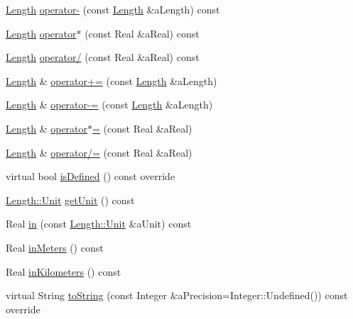 \begin{DoxyCompactItemize}
\item 
\hyperlink{classlibrary_1_1physics_1_1units_1_1_length}{Length} \hyperlink{classlibrary_1_1physics_1_1units_1_1_length_af34113f000f221058dc48df951c0c861}{operator-\/} (const \hyperlink{classlibrary_1_1physics_1_1units_1_1_length}{Length} \&a\+Length) const
\item 
\hyperlink{classlibrary_1_1physics_1_1units_1_1_length}{Length} \hyperlink{classlibrary_1_1physics_1_1units_1_1_length_ab14bc23b1849cb38d2f9ede2bda27ca5}{operator$\ast$} (const Real \&a\+Real) const
\item 
\hyperlink{classlibrary_1_1physics_1_1units_1_1_length}{Length} \hyperlink{classlibrary_1_1physics_1_1units_1_1_length_a00c891576d9dac185b81cca7d705653e}{operator/} (const Real \&a\+Real) const
\item 
\hyperlink{classlibrary_1_1physics_1_1units_1_1_length}{Length} \& \hyperlink{classlibrary_1_1physics_1_1units_1_1_length_ac3a51c8bd2a7c6f9ef39a3444d0bc3dc}{operator+=} (const \hyperlink{classlibrary_1_1physics_1_1units_1_1_length}{Length} \&a\+Length)
\item 
\hyperlink{classlibrary_1_1physics_1_1units_1_1_length}{Length} \& \hyperlink{classlibrary_1_1physics_1_1units_1_1_length_a5b02e27f94eea5c5b2b4c7a8e36ab243}{operator-\/=} (const \hyperlink{classlibrary_1_1physics_1_1units_1_1_length}{Length} \&a\+Length)
\item 
\hyperlink{classlibrary_1_1physics_1_1units_1_1_length}{Length} \& \hyperlink{classlibrary_1_1physics_1_1units_1_1_length_a60c23be1726de0970339298e4053e75d}{operator$\ast$=} (const Real \&a\+Real)
\item 
\hyperlink{classlibrary_1_1physics_1_1units_1_1_length}{Length} \& \hyperlink{classlibrary_1_1physics_1_1units_1_1_length_a42aee215b77a88b3c032b1fc6b8d7117}{operator/=} (const Real \&a\+Real)
\item 
virtual bool \hyperlink{classlibrary_1_1physics_1_1units_1_1_length_a0249a542e7cc613e6a39275b4e37bd05}{is\+Defined} () const override
\item 
\hyperlink{classlibrary_1_1physics_1_1units_1_1_length_a3b8b39cd245cf6b19dc34459baeccb18}{Length\+::\+Unit} \hyperlink{classlibrary_1_1physics_1_1units_1_1_length_ab0a44822f33903e24c3dc8021d185348}{get\+Unit} () const
\item 
Real \hyperlink{classlibrary_1_1physics_1_1units_1_1_length_a8cabc872d3de8fe8c9abf9d09462a7e8}{in} (const \hyperlink{classlibrary_1_1physics_1_1units_1_1_length_a3b8b39cd245cf6b19dc34459baeccb18}{Length\+::\+Unit} \&a\+Unit) const
\item 
Real \hyperlink{classlibrary_1_1physics_1_1units_1_1_length_ae8064733601131d3ccf1e5d53ecaf001}{in\+Meters} () const
\item 
Real \hyperlink{classlibrary_1_1physics_1_1units_1_1_length_a0d57a97fc408ae0f1a5353d0ee5837aa}{in\+Kilometers} () const
\item 
virtual String \hyperlink{classlibrary_1_1physics_1_1units_1_1_length_aea1d96e6930f7e6e6383e78c55219a64}{to\+String} (const Integer \&a\+Precision=Integer\+::\+Undefined()) const override
\end{DoxyCompactItemize}
